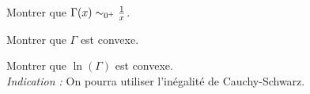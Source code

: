 
\begin{exercice}
\begin{questions}
\item Montrer que $\Gamma(x) \isEquivTo{0^+} \frac{1}{x}$.

\item Montrer que $\Gamma$ est convexe.

\item Montrer que $\ln(\Gamma)$ est convexe.\\
\emph{Indication :} On pourra utiliser l'inégalité de Cauchy-Schwarz.
\end{questions}
\end{exercice}

